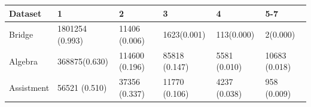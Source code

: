 \documentclass{scrartcl}
\begin{document}
\begin{table}
	\begin{tabular}{| l | l | l | l |l | l |}
    \hline
    Dataset & 1 & 2 & 3 & 4 & 5-7\\ \hline
    Bridge & 1801254 (0.993) & 11406 (0.006) & 1623(0.001)&113(0.000)&2(0.000) \\ \hline
    Algebra & 368875(0.630)  & 114600 (0.196) & 85818 (0.147)&5581 (0.010)&10683 (0.018) \\ \hline
    Assistment & 56521 (0.510) & 37356 (0.337) & 11770 (0.106) & 4237 (0.038)&958 (0.009)\\
    \hline
    \end{tabular}
\end{table}  

\end{document}
